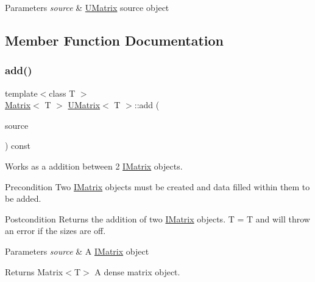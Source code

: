 \begin{DoxyParams}{Parameters}
{\em source} & \mbox{\hyperlink{class_u_matrix}{U\+Matrix}} source object \\
\hline
\end{DoxyParams}


\subsection{Member Function Documentation}
\mbox{\label{class_u_matrix_a646d97c9891d10bfde81ac90ea002811}} 
\subsubsection{\texorpdfstring{add()}{add()}\hspace{0.1cm}{\footnotesize\ttfamily [1/6]}}
{\footnotesize\ttfamily template$<$class T $>$ \\
\mbox{\hyperlink{class_matrix}{Matrix}}$<$ T $>$ \mbox{\hyperlink{class_u_matrix}{U\+Matrix}}$<$ T $>$\+::add (\begin{DoxyParamCaption}\item[{const \mbox{\hyperlink{class_i_matrix}{I\+Matrix}}$<$ \mbox{\hyperlink{class_matrix}{Matrix}}$<$ T $>$, T $>$ \&}]{source }\end{DoxyParamCaption}) const}



Works as a addition between 2 \mbox{\hyperlink{class_i_matrix}{I\+Matrix}} objects. 

\begin{DoxyPrecond}{Precondition}
Two \mbox{\hyperlink{class_i_matrix}{I\+Matrix}} objects must be created and data filled within them to be added. 
\end{DoxyPrecond}
\begin{DoxyPostcond}{Postcondition}
Returns the addition of two \mbox{\hyperlink{class_i_matrix}{I\+Matrix}} objects. T = T and will throw an error if the sizes are off.
\end{DoxyPostcond}

\begin{DoxyParams}{Parameters}
{\em source} & A \mbox{\hyperlink{class_i_matrix}{I\+Matrix}} object \\
\hline
\end{DoxyParams}
\begin{DoxyReturn}{Returns}
Matrix$<$\+T$>$ A dense matrix object. 
\end{DoxyReturn}
\mbox{\label{class_u_matrix_ae897e1e22424ea7eea1c19ac3b9034de}} 
